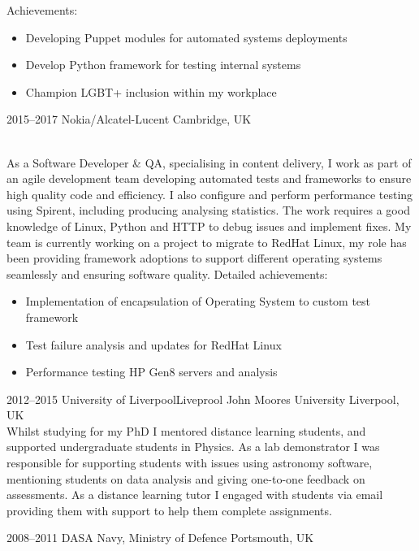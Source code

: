 \documentclass[]{cv-style}          %
\begin{document}
\begin{entrylist}
{Achievements:
\begin{itemize}
  \item Developing Puppet modules for automated systems deployments
  \item Develop Python framework for testing internal systems
  \item Champion LGBT+ inclusion within my workplace
\end{itemize}
}
\entry
  {2015--2017}
  {Nokia/Alcatel-Lucent}
  {Cambridge, UK}
  {\\
As a Software Developer \& QA, specialising in content delivery, I work as part of an agile development team developing automated tests and frameworks to ensure high quality code and efficiency. I also configure and perform performance testing using Spirent, including producing analysing statistics. The work requires a good knowledge of Linux, Python and HTTP to debug issues and implement fixes. My team is currently working on a project to migrate to RedHat Linux, my role has been providing framework adoptions to support different operating systems seamlessly and ensuring software quality.
Detailed achievements:
\begin{itemize}
  \item Implementation of encapsulation of Operating System to custom test framework
  \item Test failure analysis and updates for RedHat Linux
  \item Performance testing HP Gen8 servers and analysis
\end{itemize}
}
\entry
  {2012--2015}
  {University of Liverpool\/Liveprool John Moores University}
  {Liverpool, UK}
  {\\
  Whilst studying for my PhD I mentored distance learning students, and supported undergraduate students in Physics. As a lab demonstrator I was responsible for supporting students with issues using astronomy software, mentioning students on data analysis and giving one-to-one feedback on assessments.  As a distance learning tutor I engaged with students via email providing them with support to help them complete assignments.\\
  }
\end{entrylist}
\begin{entrylist}

\entry
  {2008--2011}
  {DASA Navy, Ministry of Defence}
  {Portsmouth, UK}
  {\\
  }
\end{entrylist}
\end{document}
